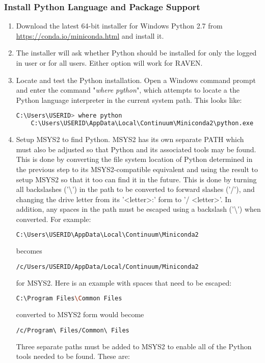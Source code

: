 \subsubsection{Install Python Language and Package Support}
\begin{enumerate}
	\item Download the latest 64-bit installer for Windows Python 2.7 from
		\url{https://conda.io/miniconda.html} and install it.  \item The installer
		will ask whether Python should be installed for only the logged in user or
		for all users.  Either option will work for RAVEN.
	\item Locate and test the Python installation.   Open a Windows command prompt and enter the
		command "{\it where python}", which attempts to locate a the Python language interpreter
		in the current system path.  This looks like:

    \begin{lstlisting}[language=bash, basicstyle=\small]
    C:\Users\USERID> where python
    C:\Users\USERID\AppData\Local\Continuum\Miniconda2\python.exe
    \end{lstlisting}

	\item Setup MSYS2 to find Python.  MSYS2 has its own separate PATH which must also be adjusted
		so that Python and its associated tools may be found. This is done by converting the
		file system location of Python determined in the previous step to its MSYS2-compatible
		equivalent and using the result to setup MSYS2 so that it too can find it in the future.
		\newline \newline
		This is done by turning all backslashes ('\textbackslash') in the path to be converted to
		forward slashes ('/'), and changing the drive letter from its '\textless letter\textgreater:'
		form to '/ \textless letter\textgreater'. In addition, any spaces in the path must
		be escaped using a backslash ('\textbackslash') when converted.
		\newline \newline
		For example:

\begin{lstlisting}[language=bash]
C:\Users\USERID\AppData\Local\Continuum\Miniconda2
\end{lstlisting}
		becomes
\begin{lstlisting}[language=bash]
/c/Users/USERID/AppData/Local/Continuum/Miniconda2
\end{lstlisting}
		for MSYS2. Here is an example with spaces that need to be escaped:
\begin{lstlisting}[language=bash]
C:\Program Files\Common Files
\end{lstlisting}
		converted to MSYS2 form would become
\begin{lstlisting}[language=bash]
/c/Program\ Files/Common\ Files
\end{lstlisting}
		\medskip
		Three separate paths must be added to MSYS2 to enable all of the Python tools needed
		to be found.  These are:


\end{enumerate}
